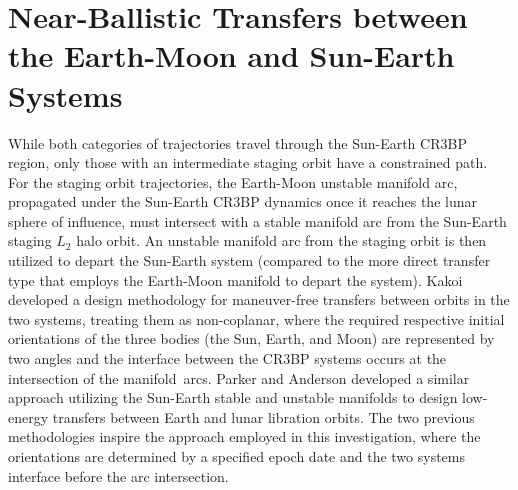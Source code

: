 \section{Near-Ballistic Transfers between the Earth-Moon and Sun-Earth Systems}\label{sec:NearBallistic}
While both categories of trajectories travel through the Sun-Earth CR3BP region, only those with an
intermediate staging orbit have a constrained path. For the staging orbit trajectories, the
Earth-Moon unstable manifold arc, propagated under the Sun-Earth CR3BP dynamics once it reaches the
lunar sphere of influence, must intersect with a stable manifold arc from the Sun-Earth staging
$L_{2}$ halo orbit. An unstable manifold arc from the staging orbit is then utilized to depart the
Sun-Earth system (compared to the more direct transfer type that employs the Earth-Moon manifold to
depart the system). Kakoi developed a design methodology for maneuver-free transfers between orbits
in the two systems, treating them as non-coplanar, where the required respective initial
orientations of the three bodies (the Sun, Earth, and Moon) are represented by two angles and the
interface between the CR3BP systems occurs at the intersection of the manifold\
arcs\cite{Kakoi:2014,Kakoi:2015}. Parker and Anderson developed a similar approach utilizing the
Sun-Earth stable and unstable manifolds to design low-energy transfers between Earth and lunar
libration orbits\cite{Parker:2013}. The two previous methodologies inspire the approach employed in
this investigation, where the orientations are determined by a specified epoch date and the two
systems interface before the arc intersection.

